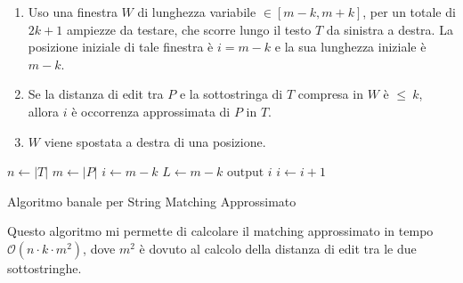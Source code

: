\begin{enumerate}
    \item Uso una finestra $W$ di lunghezza variabile $\in [m - k, m + k]$, per un totale di $2k+1$ ampiezze da testare, che scorre lungo il testo $T$ da sinistra a destra. La posizione iniziale di tale finestra è $i = m - k$ e la sua lunghezza iniziale è $m - k$.
    \item Se la distanza di edit tra $P$ e la sottostringa di $T$ compresa in $W$ è $\leq \ k$, allora $i$ è occorrenza approssimata di $P$ in $T$.
    \item $W$ viene spostata a destra di una posizione.
\end{enumerate}
\begin{algorithm}
  \begin{algorithmic}
    \State $n\gets |T|$
    \State $m \gets |P|$
    \State $i\gets m - k$
    \State $L \gets  m - k$
            \State $\text{output } i$
        \EndIf
    \EndWhile
    \State $i \gets i + 1$
    \EndWhile
    \EndFunction
  \end{algorithmic}
  \caption{Algoritmo banale per String Matching Approssimato}
\end{algorithm}

Questo algoritmo mi permette di calcolare il matching approssimato in tempo $\mathcal{O}(n \cdot k \cdot m^2)$, dove $m^2$ è dovuto al calcolo della distanza di edit tra le due sottostringhe.
